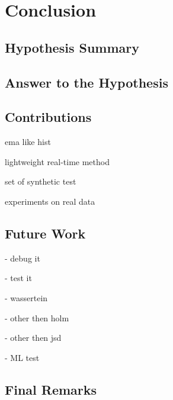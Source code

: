 \chapter{Conclusion} \label{chap:conclusion} \minitoc

\section{Hypothesis Summary}
\section{Answer to the Hypothesis}
\section{Contributions}
ema like hist

lightweight real-time method

set of synthetic test

experiments on real data

\section{Future Work}

- debug it

- test it

- wassertein

- other then holm

- other then jsd

- ML test

\section{Final Remarks}